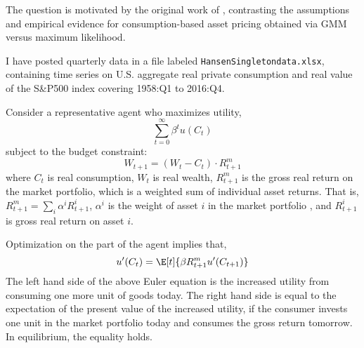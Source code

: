The question is motivated by the original work of \citeauthor{hansen1982generalized}, contrasting the assumptions and empirical evidence for consumption-based asset pricing obtained via GMM versus maximum likelihood. 

I have posted quarterly data in a ﬁle labeled \texttt{HansenSingletondata.xlsx}, containing time series on U.S. aggregate real private consumption and real value of the S\&P500 index covering 1958:Q1 to 2016:Q4.

Consider a representative agent who maximizes utility,
\[
    \sum_{t=0}^\infty \beta^t u(C_t)
\]
subject to the budget constraint:
\[
    W_{t+1}=(W_t-C_t) \cdot R_{t+1}^m
\]
where \(C_t\) is real consumption, \(W_t\) is real wealth, \(R_{t+1}^m\) is the gross real return on the market portfolio, which is a weighted sum of individual asset returns. That is, \(R_{t+1}^m = \sum_i \alpha^iR_{t+1}^i\), \(\alpha^i\) is the weight of asset \(i\) in the market portfolio , and \(R_{t+1}^i\) is gross real return on asset \(i\).

Optimization on the part of the agent implies that,
\[
    u^\prime(C_t) = \E[t]{\beta R_{t+1}^m u^\prime(C_{t+1})}
\]
The left hand side of the above Euler equation is the increased utility from consuming one more unit of goods today. The right hand side is equal to the expectation of the present value of the increased utility, if the consumer invests one unit in the market portfolio today and consumes the gross return tomorrow. In equilibrium, the equality holds.

